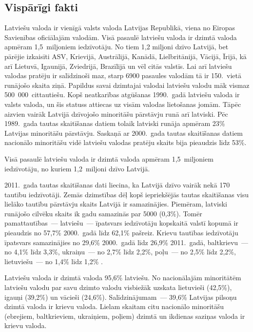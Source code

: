 \begin{multicols}{2}

\subsection{Vispārīgi fakti}

Latviešu valoda ir vienīgā valsts valoda Latvijas Republikā, viena no Eiropas Savienības oficiālajām valodām.
Visā pasaulē latviešu valoda ir dzimtā valoda apmēram 1,5~miljoniem iedzīvotāju. 
No tiem 1,2 miljoni dzīvo Latvijā, bet pārējie izkaisīti ASV, Krievijā, Austrālijā, Kanādā, Lielbritānijā, Vācijā, Īrijā, kā arī Lietuvā, Igaunijā, Zviedrijā, Brazīlijā un vēl citās valstīs. 
Lai arī latviešu valodas pratēju ir salīdzinoši maz, starp 6900 pasaules valodām tā ir 150.~vietā runājošo skaita ziņā. 
Papildus savai dzimtajai valodai latviešu valodu māk vismaz 500~000~cittautiešu. 
Kopš neatkarības atgūšanas 1990.~gadā latviešu valoda ir valsts valoda, un šis statuss attiecas uz visām valodas lietošanas jomām.
Tāpēc aizvien vairāk Latvijā dzīvojošo minoritāšu pārstāvju runā arī latviski. 
Pēc 1989.~gada tautas skaitīšanas datiem tolaik latviski runāja apmēram 23\% Latvijas minoritāšu pārstāvju. 
Saskaņā ar 2000.~gada tautas skaitīšanas datiem nacionālo minoritāšu vidē latviešu valodas pratēju skaits bija pieaudzis līdz 53\%. 


Visā pasaulē latviešu valoda ir dzimtā valoda apmēram 1,5~miljoniem iedzīvotāju, no kuriem 1,2~miljoni dzīvo Latvijā.

2011.~gada tautas skaitīšanas dati liecina, ka Latvijā dzīvo vairāk nekā 170 tautību iedzīvotāji. 
Zemās \mbox{dzimstības} dēļ kopš iepriekšējās tautas skaitīšanas visu \mbox{lielāko} tautību pārstāvju skaits Latvijā ir samazinājies. 
Piemēram, latviski runājošo cilvēku skaits ik gadu samazinās par 5000 (0,3\%). 
Tomēr pamattautības~--- latviešu~--- īpatsvars iedzīvotāju kopskaitā valstī kopumā ir pieaudzis no 57,7\% 2000.~gadā līdz 62,1\% pašreiz. 
Krievu tautības iedzīvotāju īpatsvars samazinājies no 29,6\% 2000.~gadā līdz 26,9\% 2011.~gadā, baltkrievu~--- no 4,1\% līdz 3,3\%, ukraiņu~--- no 2,7\% līdz 2,2\%, poļu~--- no 2,5\% līdz 2,2\%, lietuviešu~--- no 1,4\% līdz 1,2\% \cite{Meta54}.

Latviešu valoda ir dzimtā valoda 95,6\% latviešu. 
No nacionālajām minoritātēm latviešu valodu par savu dzimto valodu visbiežāk uzskata lietuvieši (42,5\%), igauņi (39,2\%) un vācieši (24,6\%).
Salīdzinājumam~--- 39,6\% Latvijas pilsoņu dzimtā valoda ir krievu valoda.
Lielam skaitam citu nacionālo minoritāšu (ebrejiem, baltkrieviem, ukraiņiem, poļiem) dzimtā un ikdienas saziņas valoda ir krievu valoda.


\end{multicols}
